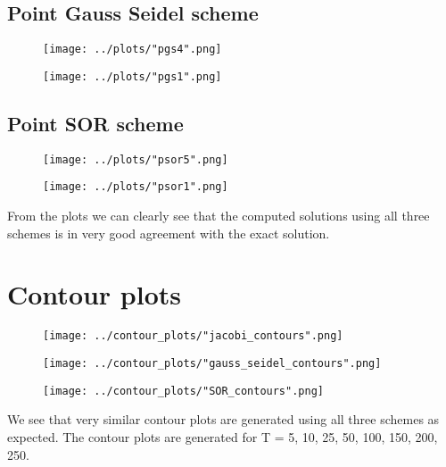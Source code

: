 \documentclass[a4paper,twoside,11pt]{article}
\begin{document}
\subsection*{Point Gauss Seidel scheme}
  \begin{figure}[h]
    \centering
    \begin{minipage}{.5\textwidth}
      \centering
      \texttt{[image: ../plots/"pgs4".png]}
      \label{fig:test1}
    \end{minipage}%
    \begin{minipage}{.5\textwidth}
      \centering
      \texttt{[image: ../plots/"pgs1".png]}
      \label{fig:test2}
    \end{minipage}
    \end{figure}

\subsection*{Point SOR scheme}
    \begin{figure}[h]
      \centering
      \begin{minipage}{.5\textwidth}
        \centering
        \texttt{[image: ../plots/"psor5".png]}
        \label{fig:test1}
      \end{minipage}%
      \begin{minipage}{.5\textwidth}
        \centering
        \texttt{[image: ../plots/"psor1".png]}
        \label{fig:test2}
      \end{minipage}
      \end{figure}


From the plots we can clearly see that the computed solutions using all three schemes is in very good agreement with the exact solution.
\section*{Contour plots}
\begin{figure}[h]
  \centering
  \begin{minipage}{.33\textwidth}
    \centering
    \texttt{[image: ../contour\_plots/"jacobi\_contours".png]}
    \label{fig:test1}
  \end{minipage}%
  \begin{minipage}{.33\textwidth}
    \centering
    \texttt{[image: ../contour\_plots/"gauss\_seidel\_contours".png]}
    \label{fig:test2}
  \end{minipage}
  \begin{minipage}{.33\textwidth}
    \centering
    \texttt{[image: ../contour\_plots/"SOR\_contours".png]}
    \label{fig:test2}
  \end{minipage}
  \end{figure}

We see that very similar contour plots are generated using all three schemes as expected. The contour plots are generated for T = 5, 10, 25, 50, 100, 150, 200, 250.
\end{document}
